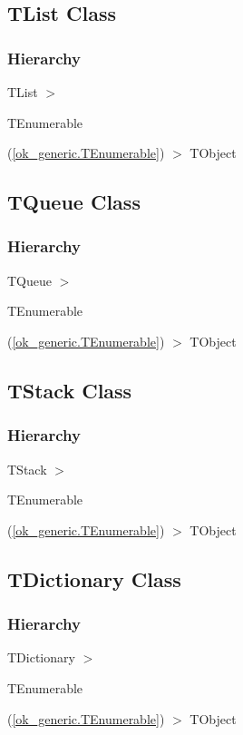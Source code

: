 \documentclass{report}
\begin{document}
\subsection*{TList Class}
\subsubsection*{\large{\textbf{Hierarchy}}\normalsize\hspace{1ex}\hfill}
TList {$>$} \begin{ttfamily}TEnumerable\end{ttfamily}(\ref{ok_generic.TEnumerable}) {$>$} 
TObject
\subsection*{TQueue Class}
\subsubsection*{\large{\textbf{Hierarchy}}\normalsize\hspace{1ex}\hfill}
TQueue {$>$} \begin{ttfamily}TEnumerable\end{ttfamily}(\ref{ok_generic.TEnumerable}) {$>$} 
TObject
\subsection*{TStack Class}
\subsubsection*{\large{\textbf{Hierarchy}}\normalsize\hspace{1ex}\hfill}
TStack {$>$} \begin{ttfamily}TEnumerable\end{ttfamily}(\ref{ok_generic.TEnumerable}) {$>$} 
TObject
\subsection*{TDictionary Class}
\subsubsection*{\large{\textbf{Hierarchy}}\normalsize\hspace{1ex}\hfill}
TDictionary {$>$} \begin{ttfamily}TEnumerable\end{ttfamily}(\ref{ok_generic.TEnumerable}) {$>$} 
TObject
\end{document}
